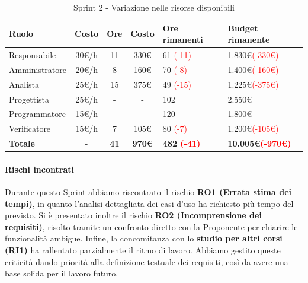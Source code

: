 \documentclass[a4paper,12pt]{article}
\begin{document}
\begin{table}[H]
    \centering
    \renewcommand{\arraystretch}{1.5}
    \begin{tabularx}{\textwidth}{|l|c|c|c|X|X|}
        \hline
        \rowcolor{tableHeader}
        \textbf{Ruolo} & \textbf{Costo} & \textbf{Ore} & \textbf{Costo} & \textbf{Ore rimanenti} & \textbf{Budget rimanente} \\
        \hline
        \rowcolor{tableLineOdd}
        Responsabile & 30\euro/h & 11 & 330\euro & 61 \textcolor{red}{(-11)} & 1.830\euro \textcolor{red}{(-330\euro)} \\
        \hline
        \rowcolor{tableLineEven}
        Amministratore & 20\euro/h & 8 & 160\euro & 70 \textcolor{red}{(-8)} & 1.400\euro \textcolor{red}{(-160\euro)} \\
        \hline
        \rowcolor{tableLineOdd}
        Analista & 25\euro/h & 15 & 375\euro & 49 \textcolor{red}{(-15)} & 1.225\euro \textcolor{red}{(-375\euro)} \\
        \hline
        \rowcolor{tableLineEven}
        Progettista & 25\euro/h & - & - & 102 & 2.550\euro \\
        \hline
        \rowcolor{tableLineOdd}
        Programmatore & 15\euro/h & - & - & 120 & 1.800\euro \\
        \hline
        \rowcolor{tableLineEven}
        Verificatore & 15\euro/h & 7 & 105\euro & 80 \textcolor{red}{(-7)} & 1.200\euro \textcolor{red}{(-105\euro)} \\
        \hline
        \rowcolor{tableHeader}
        \textbf{Totale} & - & \textbf{41} & \textbf{970\euro} & \textbf{482 \textcolor{red}{(-41)}} & \textbf{10.005\euro \textcolor{red}{(-970\euro)}} \\
        \hline
    \end{tabularx}
    \caption{Sprint 2 - Variazione nelle risorse disponibili}
\end{table}

\paragraph{Rischi incontrati}
Durante questo Sprint abbiamo riscontrato il rischio \textbf{RO1 (Errata stima dei tempi)}, in quanto l'analisi dettagliata dei casi d'uso ha richiesto più tempo del previsto. Si è presentato inoltre il rischio \textbf{RO2 (Incomprensione dei requisiti)}, risolto tramite un confronto diretto con la Proponente per chiarire le funzionalità ambigue. Infine, la concomitanza con lo \textbf{studio per altri corsi (RI1)} ha rallentato parzialmente il ritmo di lavoro. Abbiamo gestito queste criticità dando priorità alla definizione testuale dei requisiti, così da avere una base solida per il lavoro futuro.
\end{document}
